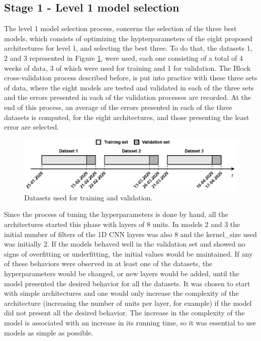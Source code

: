 \subsection{Stage 1 - Level 1 model selection}\label{sec:part1}

The level 1 model selection process, concerns the selection of the three best models, which consists of optimizing the hypterparameters of the eight proposed architectures for level 1, and selecting the best three. To do that, the datasets 1, 2 and 3 represented in Figure \ref{hyptun}, were used, each one consisting of a total of 4 weeks of data, 3 of which were used for training and 1 for validation. The Block cross-validation process described before, is put into practice with these three sets of data, where the eight models are tested and validated in each of the three sets and the errors presented in each of the validation processes are recorded. At the end of this process, an average of the errors presented in each of the three datasets is computed, for the eight architectures, and those presenting the least error are selected. 

\begin{figure}[h!]
    \centering
    \begin{center}
    \includegraphics[width=1\textwidth]{Images/hyptun_1.png}
    \caption{Datasets used for training and validation.}
    \label{hyptun}
    \end{center}
\end{figure}

Since the process of tuning the hyperparameters is done by hand, all the architectures started this phase with layers of 8 units. In models 2 and 3 the initial number of filters of the \ac{1D CNN} layers was also 8 and the kernel\_size used was initially 2. If the models behaved well in the validation set and showed no signs of overfitting or underfitting, the initial values would be maintained. If any of these behaviors were observed in at least one of the datasets, the hyperparameters would be changed, or new layers would be added, until the model presented the desired behavior for all the datasets. It was chosen to start with simple architectures and one would only increase the complexity of the architecture (increasing the number of units per layer, for example) if the model did not present all the desired behavior. The increase in the complexity of the model is associated with an increase in its running time, so it was essential to use models as simple as possible. 


